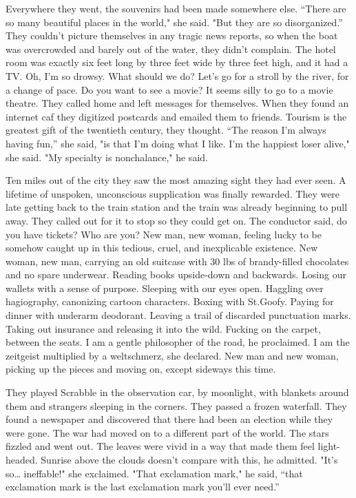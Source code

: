 \documentclass[
]{memoir}
\begin{document}
Everywhere they went, the souvenirs had been made somewhere else.
``There are so many beautiful places in the world," she said. "But they
are so disorganized.'' They couldn't picture themselves in any tragic
news reports, so when the boat was overcrowded and barely out of the
water, they didn't complain. The hotel room was exactly six feet long by
three feet wide by three feet high, and it had a TV. Oh, I'm so drowsy.
What should we do? Let's go for a stroll by the river, for a change of
pace. Do you want to see a movie? It seems silly to go to a movie
theatre. They called home and left messages for themselves. When they
found an internet caf they digitized postcards and emailed them to
friends. Tourism is the greatest gift of the twentieth century, they
thought. ``The reason I'm always having fun,'' she said, "is that I'm
doing what I like. I'm the happiest loser alive," she said. "My
specialty is nonchalance," he said.

Ten miles out of the city they saw the most amazing sight they had ever
seen. A lifetime of unspoken, unconscious supplication was finally
rewarded. They were late getting back to the train station and the train
was already beginning to pull away. They called out for it to stop so
they could get on. The conductor said, do you have tickets? Who are you?
New man, new woman, feeling lucky to be somehow caught up in this
tedious, cruel, and inexplicable existence. New woman, new man, carrying
an old suitcase with 30 lbs of brandy-filled chocolates and no spare
underwear. Reading books upside-down and backwards. Losing our wallets
with a sense of purpose. Sleeping with our eyes open. Haggling over
hagiography, canonizing cartoon characters. Boxing with St.Goofy. Paying
for dinner with underarm deodorant. Leaving a trail of discarded
punctuation marks. Taking out insurance and releasing it into the wild.
Fucking on the carpet, between the seats. I am a gentle philosopher of
the road, he proclaimed. I am the zeitgeist multiplied by a weltschmerz,
she declared. New man and new woman, picking up the pieces and moving
on, except sideways this time.

They played Scrabble in the observation car, by moonlight, with blankets
around them and strangers sleeping in the corners. They passed a frozen
waterfall. They found a newspaper and discovered that there had been an
election while they were gone. The war had moved on to a different part
of the world. The stars fizzled and went out. The leaves were vivid in a
way that made them feel light-headed. Sunrise above the clouds doesn't
compare with this, he admitted. "It's so\ldots{} ineffable!" she
exclaimed. "That exclamation mark," he said, ``that exclamation mark is
the last exclamation mark you'll ever need.''
\end{document}
